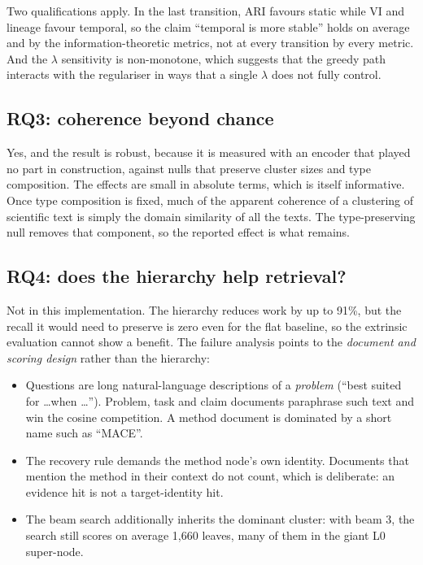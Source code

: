 \documentclass[11pt,a4paper]{article}
\theoremstyle{remark}
\begin{document}
Two qualifications apply. In the last transition, ARI favours static while VI and lineage
favour temporal, so the claim ``temporal is more stable'' holds on average and by the
information-theoretic metrics, not at every transition by every metric. And the $\lambda$
sensitivity is non-monotone, which suggests that the greedy path interacts with the regulariser
in ways that a single $\lambda$ does not fully control.

\subsection{RQ3: coherence beyond chance}

Yes, and the result is robust, because it is measured with an encoder that played no part in
construction, against nulls that preserve cluster sizes and type composition. The effects are
small in absolute terms, which is itself informative. Once type composition is fixed, much of
the apparent coherence of a clustering of scientific text is simply the domain similarity of
all the texts. The type-preserving null removes that component, so the reported effect is what
remains.

\subsection{RQ4: does the hierarchy help retrieval?}

Not in this implementation. The hierarchy reduces work by up to 91\%, but the recall it would
need to preserve is zero even for the flat baseline, so the extrinsic evaluation cannot show a
benefit. The failure analysis points to the \emph{document and scoring design} rather than the
hierarchy:

\begin{itemize}
  \item Questions are long natural-language descriptions of a \emph{problem} (``best suited for
        \dots when \dots''). Problem, task and claim documents paraphrase such text and win the
        cosine competition. A method document is dominated by a short name such as ``MACE''.
  \item The recovery rule demands the method node's own identity. Documents that mention the
        method in their context do not count, which is deliberate: an evidence hit is not a
        target-identity hit.
  \item The beam search additionally inherits the dominant cluster: with beam 3, the search
        still scores on average 1{,}660 leaves, many of them in the giant L0 super-node.
\end{itemize}
\end{document}
